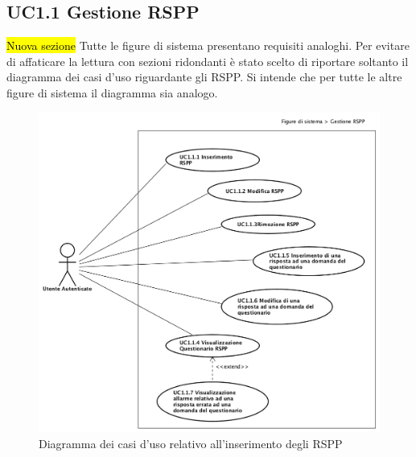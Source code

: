 	\subsection{UC1.1 Gestione RSPP}
	\label{section:UC1_1}
	\hl{Nuova sezione}
	Tutte le figure di sistema presentano requisiti analoghi. Per evitare di affaticare la lettura con sezioni ridondanti è stato scelto di riportare soltanto il diagramma dei casi d'uso riguardante gli RSPP. Si intende che per tutte le altre figure di sistema il diagramma sia analogo. 
		\begin{figure}[H]
			\begin{center}
				\includegraphics[width=14cm]{Pics/UC1_1_FigureDiSistema_RSPP.png}
				\caption{Diagramma dei casi d'uso relativo all'inserimento degli RSPP}
				\label{fig:UC1_1RSPP}
			\end{center}
		\end{figure}
